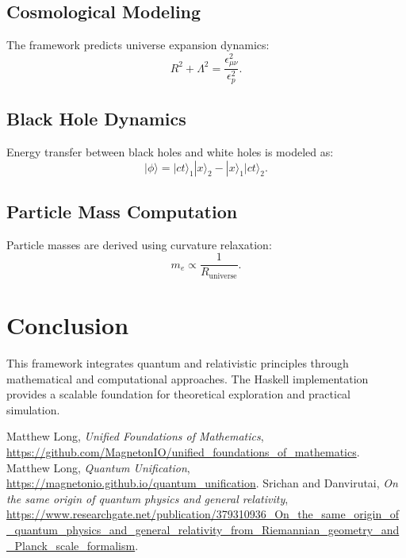 \documentclass[a4paper,11pt]{article}
\begin{document}
\subsection{Cosmological Modeling}
The framework predicts universe expansion dynamics:
\[
R^2 + \Lambda^2 = \frac{\epsilon_{\mu\nu}^2}{\epsilon_p^2}.
\]

\subsection{Black Hole Dynamics}
Energy transfer between black holes and white holes is modeled as:
\[
| \phi \rangle = |ct \rangle_1 |x \rangle_2 - |x \rangle_1 |ct \rangle_2.
\]

\subsection{Particle Mass Computation}
Particle masses are derived using curvature relaxation:
\[
m_e \propto \frac{1}{R_\text{universe}}.
\]

\section{Conclusion}
This framework integrates quantum and relativistic principles through mathematical and computational approaches. The Haskell implementation provides a scalable foundation for theoretical exploration and practical simulation.


\begin{thebibliography}{9}
Matthew Long, \emph{Unified Foundations of Mathematics}, \url{https://github.com/MagnetonIO/unified_foundations_of_mathematics}.
Matthew Long, \emph{Quantum Unification}, \url{https://magnetonio.github.io/quantum_unification}.
Srichan and Danvirutai, \emph{On the same origin of quantum physics and general relativity}, \url{https://www.researchgate.net/publication/379310936_On_the_same_origin_of_quantum_physics_and_general_relativity_from_Riemannian_geometry_and_Planck_scale_formalism}.
\end{thebibliography}
\end{document}
